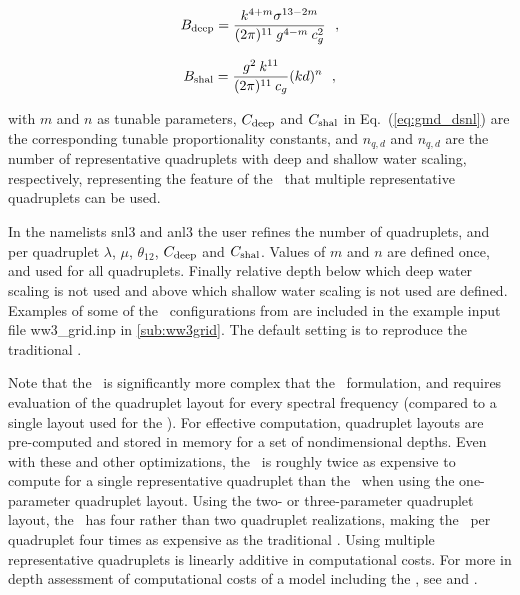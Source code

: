 \begin{equation}
B_{\rm{deep}} = \frac{k^{4+m} \sigma^{13-2m} }{(2\pi)^{11} \:
                 g^{4-m} \: c_g^2 } \:\:\: , \label{eq:gmd_B_deep}
\end{equation}

\begin{equation}
B_{\rm{shal}} = \frac{g^2 \: k^{11}}{(2\pi)^{11} \: c_g} (kd)^n
\:\:\: , \label{eq:gmd_B_shal}
\end{equation}

\noindent
with $m$ and $n$ as tunable parameters, $C_{\rm{deep}}$ and $C_{\rm{shal}}$
in Eq.~(\ref{eq:gmd_dsnl}) are the corresponding tunable proportionality
constants, and $n_{q,d}$ and $n_{q,d}$ are the number of representative
quadruplets with deep and shallow water scaling, respectively, representing
the feature of the \gmd\ that multiple representative quadruplets can be used.

In the namelists {\F snl3} and {\F anl3} the user refines the number of
quadruplets, and per quadruplet $\lambda$, $\mu$, $\theta_{12}$,
$C_{\rm{deep}}$ and $C_{\rm{shal}}$. Values of $m$ and $n$ are defined once,
and used for all quadruplets. Finally relative depth below which deep water
scaling is not used and above which shallow water scaling is not used are
defined. Examples of some of the \gmd\ configurations from \cite{tol:MMAB10d}
are included in the example input file {\file ww3\_grid.inp}
in \para\ref{sub:ww3grid}. The default setting is to reproduce the traditional
\dia.

Note that the \gmd\ is significantly more complex that the \dia\ formulation,
and requires evaluation of the quadruplet layout for every spectral frequency
(compared to a single layout used for the \dia). For effective computation,
quadruplet layouts are pre-computed and stored in memory for a set of
nondimensional depths. Even with these and other optimizations, the \gmd\ is
roughly twice as expensive to compute for a single representative quadruplet
than the \dia\ when using the one-parameter quadruplet layout. Using the two-
or three-parameter quadruplet layout, the \gmd\ has four rather than two
quadruplet realizations, making the \gmd\ per quadruplet four times as
expensive as the traditional \dia. Using multiple representative quadruplets
is linearly additive in computational costs. For more in depth assessment of
computational costs of a model including the \gmd, see \cite{tol:MMAB10d} and
\cite{tol:OMOD13d}.
